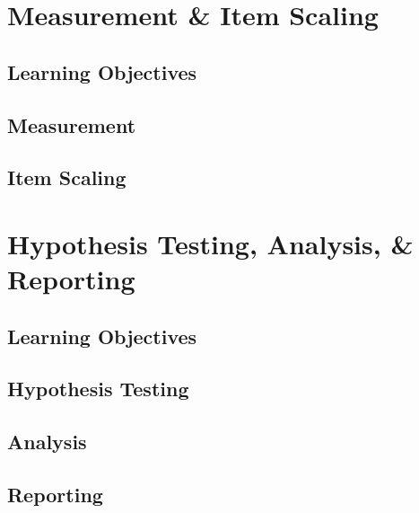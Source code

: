 \documentclass[
  letterpaper,
  DIV=11,
  numbers=noendperiod]{scrreprt}
\begin{document}

\hypertarget{measurement-item-scaling}{%
\chapter{Measurement \& Item Scaling}\label{measurement-item-scaling}}

\hypertarget{learning-objectives-6}{%
\section{Learning Objectives}\label{learning-objectives-6}}

\hypertarget{measurement}{%
\section{Measurement}\label{measurement}}

\hypertarget{item-scaling}{%
\section{Item Scaling}\label{item-scaling}}


\hypertarget{hypothesis-testing-analysis-reporting}{%
\chapter{Hypothesis Testing, Analysis, \&
Reporting}\label{hypothesis-testing-analysis-reporting}}

\hypertarget{learning-objectives-7}{%
\section{Learning Objectives}\label{learning-objectives-7}}

\hypertarget{hypothesis-testing}{%
\section{Hypothesis Testing}\label{hypothesis-testing}}

\hypertarget{analysis}{%
\section{Analysis}\label{analysis}}

\hypertarget{reporting}{%
\section{Reporting}\label{reporting}}
\end{document}
